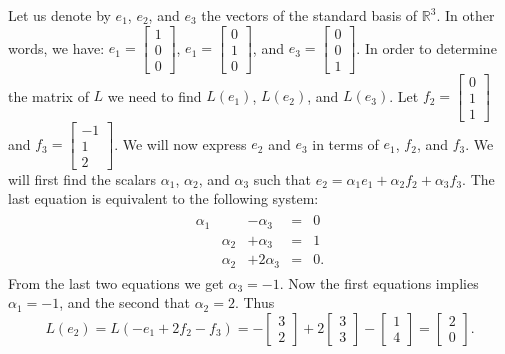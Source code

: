 Let us denote by \( e_1 \), \( e_2 \), and \( e_3 \) the vectors of the standard basis of \( \mathbb R^3 \). In other words, we have: \( e_1=\left[\begin{array}{c}1\\0\\0\end{array}\right]\), \( e_1=\left[\begin{array}{c}0\\1\\0\end{array}\right]\), and \( e_3=\left[\begin{array}{c}0\\0\\1\end{array}\right]\). In order to determine the matrix of \( L \) we need to find \( L(e_1) \), \( L(e_2) \), and \( L(e_3) \). Let \( f_2=\left[\begin{array}{c}0\\1\\1\end{array}\right]\) and \( f_3=\left[\begin{array}{c}-1\\1\\2\end{array}\right]\). We will now express \( e_2 \) and \( e_3 \) in terms of \( e_1 \), \( f_2 \), and \( f_3 \). We will first find the scalars \( \alpha_1 \), \( \alpha_2 \), and \( \alpha_3 \) such that \( e_2=\alpha_1 e_1+\alpha_2f_2+\alpha_3f_3 \). The last equation is equivalent to the following system: \begin{eqnarray*} \begin{array}{ccccc} \alpha_1&&-\alpha_3&=&0\\ &\alpha_2&+\alpha_3&=&1\\ &\alpha_2&+2\alpha_3&=&0. \end{array} \end{eqnarray*} From the last two equations we get \( \alpha_3=-1 \). Now the first equations implies \( \alpha_1=-1 \), and the second that \( \alpha_2=2 \). Thus \[L(e_2)=L(-e_1+2f_2-f_3)=-\left[\begin{array}{c}3\\2\end{array}\right]+2\left[\begin{array}{c}3\\3\end{array}\right]- \left[\begin{array}{c}1\\4\end{array}\right]=\left[\begin{array}{c}2\\0\end{array}\right].\]


